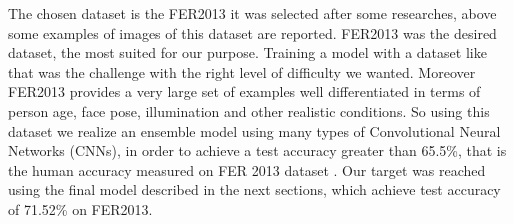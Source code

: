 \documentclass[10pt,twocolumn,letterpaper]{article}
\begin{document}
   The chosen dataset is the FER2013 it was selected after some researches, above some examples of images of this dataset are reported. 
   FER2013 was the desired dataset, the most suited for our purpose. Training a model with a dataset like that was the challenge 
   with the right level of difficulty we wanted. 
   Moreover FER2013 provides a very large set of examples well differentiated in terms of person age, face pose, illumination and other realistic conditions.
   So using this dataset we realize an ensemble model using many types of Convolutional Neural Networks (CNNs), in order to achieve a test accuracy 
   greater than 65.5\%, that is the human accuracy measured on FER 2013 dataset \cite{3}. Our target was reached using the final model described in the next 
   sections, which achieve test accuracy of 71.52\% on FER2013. 
\end{document}
